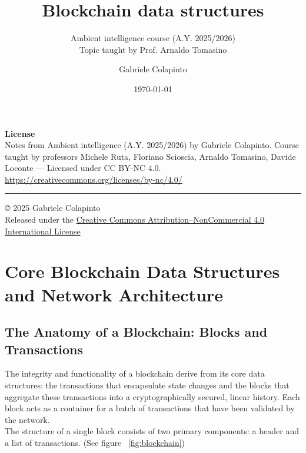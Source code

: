 \documentclass{scrbook}
\title{Blockchain data structures}
\subtitle{Ambient intelligence course (A.Y. 2025/2026)\\Topic taught by Prof. Arnaldo Tomasino}
\author{Gabriele Colapinto}
\date{\today}
\begin{document}
\maketitle
\thispagestyle{empty}

{\Large\textbf{License}} \\
{Notes from Ambient intelligence (A.Y. 2025/2026) by Gabriele Colapinto. 
Course taught by professors Michele Ruta, Floriano Scioscia, Arnaldo Tomasino, Davide Loconte — 
Licensed under CC BY-NC 4.0.\\
\url{https://creativecommons.org/licenses/by-nc/4.0/}}

\vspace*{\fill}
\rule{\textwidth}{0.2pt}
\small{© 2025 Gabriele Colapinto \\
Released under the \href{https://creativecommons.org/licenses/by-nc/4.0/}{Creative Commons Attribution–NonCommercial 4.0 International License}}

\clearpage

\tableofcontents

\chapter{Core Blockchain Data Structures and Network Architecture}

\section{The Anatomy of a Blockchain: Blocks and Transactions}

The integrity and functionality of a blockchain derive from its core data structures: the transactions that encapsulate state changes and the blocks that aggregate these transactions into a cryptographically secured, linear history. Each block acts as a container for a batch of transactions that have been validated by the network.\\

The structure of a single block consists of two primary components: a header and a list of transactions. (See figure ~\ref{fig:blockchain})\\
\end{document}
